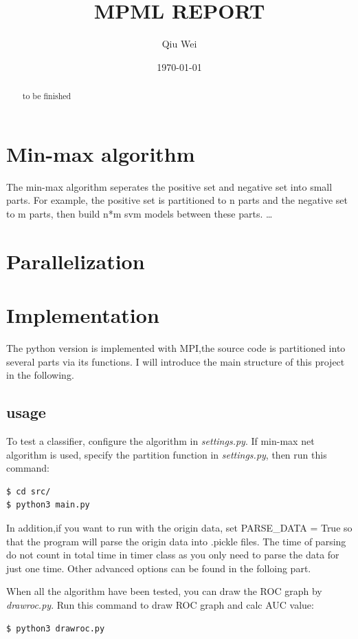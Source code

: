 \documentclass[11pt]{article}
\author{Qiu Wei}
\date{\today}
\title{MPML REPORT}
\begin{document}
\maketitle
\tableofcontents

\begin{abstract}
to be finished
\end{abstract}


\section{Min-max algorithm}
\label{sec-1}
The min-max algorithm seperates the positive set and negative set into
small parts. For example, the positive set is partitioned to n parts and
the negative set to m parts, then build n*m svm models between these parts.
\ldots{}
\section{Parallelization}
\label{sec-2}

\section{Implementation}
\label{sec-3}
The python version is implemented with MPI,the source code is partitioned into several
parts via its functions. I will introduce the main structure of this project in the following.

\subsection{usage}
\label{sec-3-1}
To test a classifier, configure the algorithm in \emph{settings.py}. If min-max net algorithm
is used, specify the partition function in \emph{settings.py}, then run this command:
\begin{verbatim}
$ cd src/
$ python3 main.py
\end{verbatim}
In addition,if you want to run with the origin data, set PARSE\_DATA = True so
that the program will parse the origin data into .pickle files. The time of
parsing do not count in total time in timer class as you only need to parse the
data for just one time. Other advanced options can be found in the folloing part.

When all the algorithm have been tested, you can draw the ROC graph by \emph{drawroc.py}.
Run this command to draw ROC graph and calc AUC value:
\begin{verbatim}
$ python3 drawroc.py
\end{verbatim}
\end{document}
